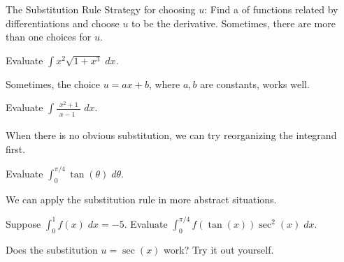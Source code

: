 \documentclass[../main.tex]{subfiles}
\begin{document}
\begin{lesson}{The Substitution Rule}
  Strategy for choosing \(u\): Find a  of functions related by differentiations and choose \(u\) to be the derivative.  Sometimes, there are more than one choices for \(u\).
  \begin{example}
    Evaluate \(\int x^{2} \sqrt{1 + x^{3}} \;dx\).
  \end{example}

  Sometimes, the choice \(u = ax + b\), where \(a,b\) are constants, works well. 
  \begin{example}
    Evaluate $\int \frac{x^{2} + 1}{\phantom{(} x - 1 \phantom{)^{1}}} \;dx$.
  \end{example}

  When there is no obvious substitution, we can try reorganizing the integrand first.
  \begin{example}
    Evaluate \(\int_{0}^{\pi/4} \tan(\theta) \;d\theta\).
  \end{example}

  We can apply the substitution rule in more abstract situations. 
  \begin{example}
    Suppose \(\int_{0}^{1} f(x) \;dx = -5\). Evaluate \(\int_{0}^{\pi/4} f(\tan(x)) \sec^{2}(x) \;dx\).
  \end{example}
  
  \faComment{} Does the substitution \(u = \sec(x)\) work? Try it out yourself.
\end{lesson}
\end{document}
